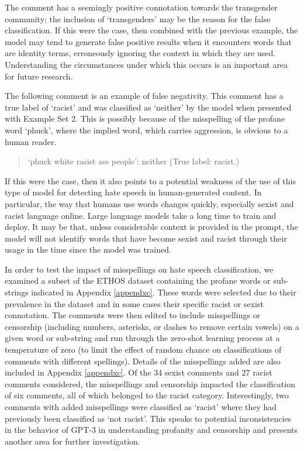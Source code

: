 \documentclass{bmcart}
\begin{document}
The comment has a seemingly positive connotation towards the transgender community; the inclusion of `transgenders' may be the reason for the false classification. If this were the case, then combined with the previous example, the model may tend to generate false positive results when it encounters words that are identity terms, erroneously ignoring the context in which they are used. Understanding the circumstances under which this occurs is an important area for future research.

The following comment is an example of false negativity. This comment has a true label of `racist' and was classified as `neither' by the model when presented with Example Set 2. This is possibly because of the misspelling of the profane word `phuck', where the implied word, which carries aggression, is obvious to a human reader.

\begin{quote}
`phuck white rasist ass people': neither (True label: racist.)
\end{quote}

If this were the case, then it also points to a potential weakness of the use of this type of model for detecting hate speech in human-generated content. In particular, the way that humans use words changes quickly, especially sexist and racist language online. Large language models take a long time to train and deploy. It may be that, unless considerable context is provided in the prompt, the model will not identify words that have become sexist and racist through their usage in the time since the model was trained.

In order to test the impact of misspellings on hate speech classification, we examined a subset of the ETHOS dataset containing the profane words or sub-strings indicated in Appendix \ref{appendxc}. These words were selected due to their prevalence in the dataset and in some cases their specific racist or sexist connotation. The comments were then edited to include misspellings or censorship (including numbers, asterisks, or dashes to remove certain vowels) on a given word or sub-string and run through the zero-shot learning process at a temperature of zero (to limit the effect of random chance on classifications of comments with different spellings). Details of the misspellings added are also included in Appendix \ref{appendxc}. Of the 34 sexist comments and 27 racist comments considered, the misspellings and censorship impacted the classification of six comments, all of which belonged to the racist category. Interestingly, two comments with added misspellings were classified as `racist' where they had previously been classified as `not racist'. This speaks to potential inconsistencies in the behavior of GPT-3 in understanding profanity and censorship and presents another area for further investigation.
\end{document}
